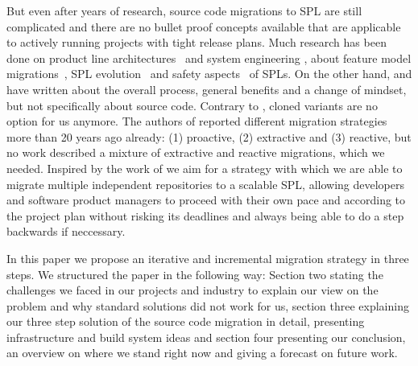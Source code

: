But even after years of research, source code migrations to SPL are still
complicated and there are no bullet proof concepts available that are applicable
to actively running projects with tight release plans. Much research has been
done on product line architectures~\cite{Svahnberg1999EPLA,
confsplcTomashchukLJ21} and system engineering \cite{confsplcSchaferBAKR21},
about feature model migrations~\cite{ncstrlustuttgartfiINPROC200185,
confsplcGrunerBKR20, confsplcDuszynskiDB19, confsplcFritschAR20}, SPL
evolution~\cite{journalssmrQuintonVRBGS21, Svahnberg1999ESPL, Eise02b,
kconfigKernel} and safety aspects~\cite{confsplcWolschke0SAM19} of SPLs. On the
other hand, \cite{confoopslaHetrickKM06} and \cite{confsplcAbbasJLESS20} have
written about the overall process, general benefits and a change of mindset, but
not specifically about source code. Contrary to \cite{confsplcRubinCC13}, cloned
variants are no option for us anymore. The authors of \cite{Krueger2001SMC}
reported different migration strategies more than 20 years ago already: (1)
proactive, (2) extractive and (3) reactive, but no work described a mixture of
extractive and reactive migrations, which we needed. Inspired by the work of
\cite{confsplcJepsenDB07} we aim for a strategy with which we are able to
migrate multiple independent repositories to a scalable SPL, allowing developers
and software product managers to proceed with their own pace and according to
the project plan without risking its deadlines and always being able to do a
step backwards if neccessary.

In this paper we propose an iterative and incremental migration strategy in
three steps. We structured the paper in the following way: Section two stating
the challenges we faced in our projects and industry to explain our view on the
problem and why standard solutions did not work for us, section three explaining
our three step solution of the source code migration in detail, presenting
infrastructure and build system ideas and section four presenting our
conclusion, an overview on where we stand right now and giving a forecast on
future work.
